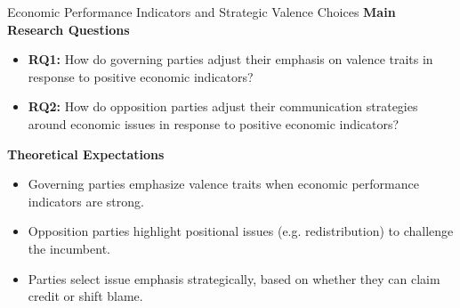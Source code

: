 \documentclass[9pt, aspectratio=169]{beamer}
\begin{document}
\begin{frame}{Economic Performance Indicators and Strategic Valence Choices}
    \textbf{Main Research Questions} \vspace{0.1cm}
    \begin{itemize}
        \item \textbf{RQ1:} How do governing parties adjust their emphasis on valence traits in response to positive economic indicators?\vspace{0.1cm}
        \item \textbf{RQ2:} How do opposition parties adjust their communication strategies around economic issues in response to positive economic indicators?
    \end{itemize}
    \vspace{0.4cm}
    \textbf{Theoretical Expectations}\vspace{0.1cm}
\begin{itemize}
    \item Governing parties emphasize valence traits when economic performance indicators are strong.\vspace{0.1cm}
    \item Opposition parties highlight positional issues (e.g. redistribution) to challenge the incumbent.\vspace{0.1cm}
    \item Parties select issue emphasis strategically, based on whether they can claim credit or shift blame.
\end{itemize}   
    \end{frame}
\end{document}
